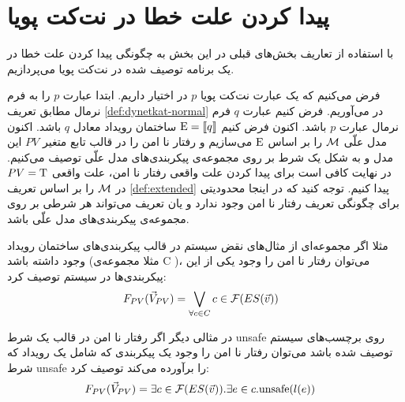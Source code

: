 \section{پیدا کردن علت خطا در نت‌کت پویا}

با استفاده از تعاریف بخش‌های قبلی در این بخش به چگونگی پیدا کردن علت خطا در یک برنامه توصیف شده در نت‌کت پویا می‌پردازیم.

فرض می‌کنیم که یک عبارت نت‌کت پویا
$p$
در اختیار داریم.
ابتدا عبارت
$p$
را به فرم نرمال مطابق تعریف 
\ref{def:dynetkat-normal}
در می‌آوریم.
فرض کنیم عبارت 
$q$
فرم نرمال
عبارت 
$p$
باشد.
اکنون فرض کنیم 
$\mathrm{E} = \llbracket q \rrbracket$
ساختمان رویداد معادل 
$q$
باشد.
اکنون مدل علّی 
$\mathcal{M}$
را بر اساس
$\mathrm{E}$
می‌سازیم و رفتار نا امن را در قالب تابع متغیر
$PV$
این مدل و به شکل یک شرط بر روی مجموعه‌ی پیکربندی‌های مدل علّی توصیف می‌کنیم.
در نهایت کافی است برای پیدا کردن علت واقعی رفتار نا امن، علت واقعی 
$PV = \mathrm{T}$
در 
$\mathcal{M}$
را بر اساس تعریف 
\ref{def:extended}
پیدا کنیم.
توجه کنید که در اینجا محدودیتی برای چگونگی تعریف رفتار نا امن وجود ندارد و یان تعریف می‌تواند هر شرطی بر روی مجموعه‌ی پیکر‌بندی‌های مدل علّی باشد.

مثلا اگر مجموعه‌ای از مثال‌های نقض سیستم در قالب پیکربندی‌های ساختمان رویداد وجود داشته باشد
(مثلا مجموعه‌ی
C
)،
می‌توان رفتار نا امن را وجود یکی از این پیکربندی‌ها در سیستم توصیف کرد:
\begin{align*}
    F_{PV}(\vec V_{PV}) & = \bigvee_{\forall c \in C} c \in \mathcal{F}(ES(\vec v))
\end{align*}

در مثالی دیگر اگر رفتار نا امن در قالب یک شرط 
unsafe
روی برچسب‌های سیستم توصیف شده باشد می‌توان رفتار نا امن را وجود یک پیکربندی که شامل یک رویداد که شرط 
unsafe
را برآورده می‌کند توصیف کرد:
\begin{align*}
    F_{PV}(\vec V_{PV}) & = \exists c \in \mathcal{F}(ES(\vec v)).\exists e \in c . \text{unsafe}(l(e))
\end{align*}



